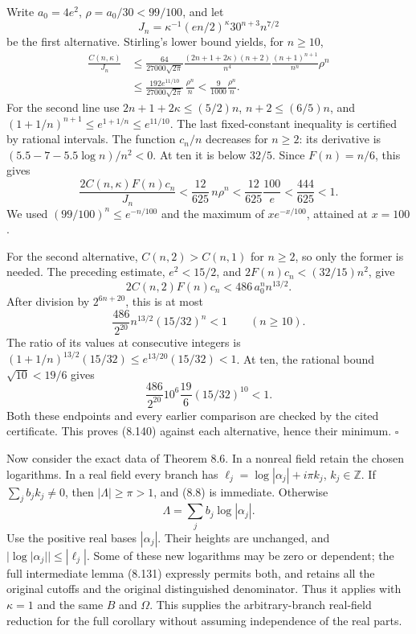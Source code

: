 \documentclass[
  11pt,
  a4paper,
]{article}
\begin{document}
Write \(a_0=4e^2\), \(\rho=a_0/30<99/100\), and let \[
J_n=\kappa^{-1}(en/2)^\kappa30^{n+3}n^{7/2}
\] be the first alternative. Stirling's lower bound yields, for
\(n\ge10\), \[
\begin{aligned}
\frac{C(n,\kappa)}{J_n}
&\le
\frac{64}{27000\sqrt{2\pi}}
\frac{(2n+1+2\kappa)(n+2)}{n^4}
\frac{(n+1)^{n+1}}{n^n}\rho^n\\
&\le\frac{192e^{11/10}}{27000\sqrt{2\pi}}\,
\frac{\rho^n}{n}
<\frac9{1000}\frac{\rho^n}{n}.
\end{aligned}
\] For the second line use \(2n+1+2\kappa\le(5/2)n\), \(n+2\le(6/5)n\),
and \((1+1/n)^{n+1}\le e^{1+1/n}\le e^{11/10}\). The last fixed-constant
inequality is certified by rational intervals. The function \(c_n/n\)
decreases for \(n\ge2\): its derivative is \((5.5-7-5.5\log n)/n^2<0\).
At ten it is below \(32/5\). Since \(F(n)=n/6\), this gives \[
\frac{2C(n,\kappa)F(n)c_n}{J_n}
<
\frac{12}{625}\,n\rho^n
<
\frac{12}{625}\frac{100}{e}
<\frac{444}{625}<1.
\] We used \((99/100)^n\le e^{-n/100}\) and the maximum of
\(xe^{-x/100}\), attained at \(x=100\).

For the second alternative, \(C(n,2)>C(n,1)\) for \(n\ge2\), so only the
former is needed. The preceding estimate, \(e^2<15/2\), and
\(2F(n)c_n<(32/15)n^2\), give \[
2C(n,2)F(n)c_n
<486\,a_0^n n^{13/2}.
\] After division by \(2^{6n+20}\), this is at most \[
\frac{486}{2^{20}}n^{13/2}(15/32)^n<1
\qquad(n\ge10).
\] The ratio of its values at consecutive integers is
\((1+1/n)^{13/2}(15/32)\le
e^{13/20}(15/32)<1\). At ten, the rational bound \(\sqrt{10}<19/6\)
gives \[
\frac{486}{2^{20}}10^6\frac{19}{6}(15/32)^{10}<1.
\] Both these endpoints and every earlier comparison are checked by the
cited certificate. This proves (8.140) against each alternative, hence
their minimum. \(\square\)

Now consider the exact data of Theorem 8.6. In a nonreal field retain
the chosen logarithms. In a real field every branch has
\(\ell_j=\log|\alpha_j|+i\pi k_j\), \(k_j\in\mathbb Z\). If
\(\sum_jb_jk_j\ne0\), then \(|\Lambda|\ge\pi>1\), and (8.8) is
immediate. Otherwise \[
\Lambda=\sum_jb_j\log|\alpha_j|.
\tag{8.141}
\] Use the positive real bases \(|\alpha_j|\). Their heights are
unchanged, and \(|\log|\alpha_j||\le|\ell_j|\). Some of these new
logarithms may be zero or dependent; the full intermediate lemma (8.131)
expressly permits both, and retains all the original cutoffs and the
original distinguished denominator. Thus it applies with \(\kappa=1\)
and the same \(B\) and \(\Omega\). This supplies the arbitrary-branch
real-field reduction for the full corollary without assuming
independence of the real parts.
\end{document}
